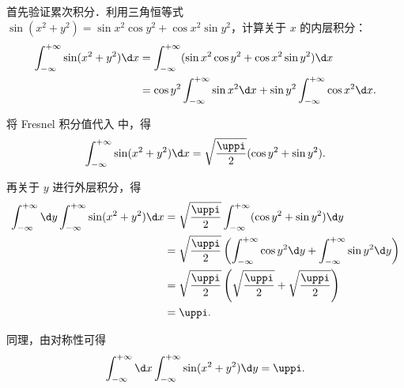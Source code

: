 \begin{myproof}
    首先验证累次积分．利用三角恒等式 $\sin(x^2 + y^2) = \sin x^2 \cos y^2 + \cos x^2 \sin y^2$，计算关于 $x$ 的内层积分：
    \begin{equation}
        \begin{aligned}
            \int_{-\infty}^{+\infty} \sin(x^2 + y^2) \d x & = \int_{-\infty}^{+\infty} (\sin x^2 \cos y^2 + \cos x^2 \sin y^2) \d x                              \\
                                                          & = \cos y^2 \int_{-\infty}^{+\infty} \sin x^2 \d x + \sin y^2 \int_{-\infty}^{+\infty} \cos x^2 \d x.
        \end{aligned}
        \label{eq:inner-integral}
    \end{equation}

    将 Fresnel 积分值代入  中，得
    \begin{equation}
        \int_{-\infty}^{+\infty} \sin(x^2 + y^2) \d x = \sqrt{\frac{\uppi}{2}} (\cos y^2 + \sin y^2).
    \end{equation}

    再关于 $y$ 进行外层积分，得
    \begin{equation}
        \begin{aligned}
            \int_{-\infty}^{+\infty} \d y \int_{-\infty}^{+\infty} \sin(x^2 + y^2) \d x & = \sqrt{\frac{\uppi}{2}} \int_{-\infty}^{+\infty} (\cos y^2 + \sin y^2) \d y                                            \\
                                                                                        & = \sqrt{\frac{\uppi}{2}} \left( \int_{-\infty}^{+\infty} \cos y^2 \d y + \int_{-\infty}^{+\infty} \sin y^2 \d y \right) \\
                                                                                        & = \sqrt{\frac{\uppi}{2}} \left( \sqrt{\frac{\uppi}{2}} + \sqrt{\frac{\uppi}{2}} \right)                                 \\
                                                                                        & = \uppi.
        \end{aligned}
        \label{eq:iterated-1}
    \end{equation}

    同理，由对称性可得
    \begin{equation}
        \int_{-\infty}^{+\infty} \d x \int_{-\infty}^{+\infty} \sin(x^2 + y^2) \d y = \uppi.
    \end{equation}


\end{myproof}
